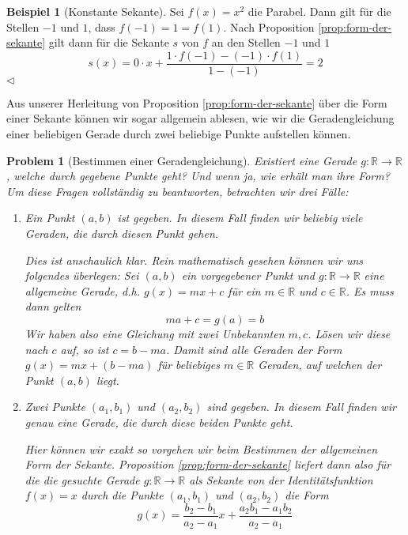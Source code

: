 \documentclass[11pt,reqno, a4paper]{book}
\newcommand{\normal}[1]{{\normalfont #1}}
\theoremstyle{mystyle}
\newtheorem{problem}[theorem]{Problem}
\theoremstyle{definition}
\newtheorem{exampleth}[theorem]{Beispiel}
\newenvironment{example}{\begin{exampleth}}{\hspace{\fill}$\triangleleft$\end{exampleth}}
\numberwithin{equation}{chapter}
\begin{document}
\begin{example}[Konstante Sekante]\label{bsp:konstante-sekante}
    Sei \(f(x)=x^2\) die Parabel. Dann gilt für die Stellen \(-1\) und \(1\), dass \(f(-1) = 1 = f(1)\). Nach Proposition \ref{prop:form-der-sekante} gilt dann für die Sekante \(s\) von \(f\) an den Stellen \(-1\) und \(1\) 
    \begin{equation*}
        s(x) = 0 \cdot x + \frac{1\cdot f(-1)-(-1)\cdot f(1)}{1 - (-1)} = 2
    \end{equation*}
\end{example}
Aus unserer Herleitung von Proposition \ref{prop:form-der-sekante} über die Form einer Sekante können wir sogar allgemein ablesen, wie wir die Geradengleichung einer beliebigen Gerade durch zwei beliebige Punkte aufstellen können. 

\begin{problem}[Bestimmen einer Geradengleichung]
    Existiert eine Gerade \(g: \mathbb R\to\mathbb R\), welche durch gegebene Punkte geht? Und wenn ja, wie erhält man ihre Form? Um diese Fragen vollständig zu beantworten, betrachten wir drei Fälle: 
    \begin{enumerate}
        \item Ein Punkt \((a,b)\) ist gegeben. In diesem Fall finden wir \normal{beliebig viele} Geraden, die durch diesen Punkt gehen. \par
        \begin{normalfont}
            Dies ist anschaulich klar. Rein mathematisch gesehen können wir uns folgendes überlegen: Sei \((a,b)\) ein vorgegebener Punkt und \(g:\mathbb R\to\mathbb R\) eine allgemeine Gerade, d.h. \(g(x) = mx+c\) für ein \(m\in \mathbb R\) und \(c\in \mathbb R\). Es muss dann gelten 
            \begin{equation*}
                ma + c = g(a) = b
            \end{equation*}
            Wir haben also eine Gleichung mit zwei Unbekannten \(m,c\). Lösen wir diese nach \(c\) auf, so ist \(c = b - ma\). Damit sind alle Geraden der Form \(g(x) = mx + (b-ma)\) für beliebiges \(m \in \mathbb R\) Geraden, auf welchen der Punkt \((a,b)\) liegt. 
        \end{normalfont}
        
        \item Zwei Punkte \((a_1,b_1)\) und \((a_2, b_2)\) sind gegeben. In diesem Fall finden wir \normal{genau eine} Gerade, die durch diese beiden Punkte geht. \par
        \begin{normalfont}
            Hier können wir exakt so vorgehen wir beim Bestimmen der allgemeinen Form der Sekante. Proposition \ref{prop:form-der-sekante} liefert dann also für die die gesuchte Gerade \(g:\mathbb R\to \mathbb R\) als Sekante von der Identitätsfunktion \(f(x) = x\) durch die Punkte \((a_1 , b_1)\) und \((a_2, b_2)\) die Form
            \begin{equation*}
                g(x) = \frac{b_2 - b_1}{a_2 - a_1}x + \frac{a_2b_1 - a_1b_2}{a_2 - a_1}
            \end{equation*}
        \end{normalfont}
        

\end{enumerate}
\end{problem}
\end{document}
